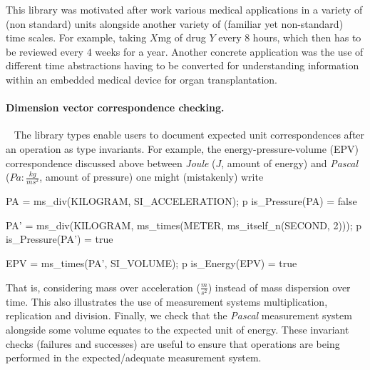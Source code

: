 \documentclass[runningheads,a4paper]{llncs}
\begin{document}
This library was motivated after work various medical applications in a variety of (non standard) units alongside another variety of (familiar yet non-standard) time scales. For example, taking \(X\)mg of drug \(Y\) every \(8\) hours, which then has to be reviewed every \(4\) weeks for a year. Another concrete application was the use of different time abstractions having to be converted for understanding information within an embedded medical device for organ transplantation.  

\paragraph*{Dimension vector correspondence checking.}~
%
The library types enable users to document expected unit correspondences after an operation as type invariants. For example, the energy-pressure-volume (EPV) correspondence discussed above between \textit{Joule} (\(J\), amount of energy) and \textit{Pascal} (\(Pa: \frac{kg}{ms^2}\), amount of pressure) one might (mistakenly) write
%
\begin{vdmsl}[frame=none,basicstyle=\ttfamily\scriptsize]
    PA = ms_div(KILOGRAM, SI_ACCELERATION);
    p is_Pressure(PA) 
    = false

    PA' = ms_div(KILOGRAM, ms_times(METER, ms_itself_n(SECOND, 2)));
    p is_Pressure(PA')
    = true

    EPV = ms_times(PA', SI_VOLUME);
    p is_Energy(EPV)
    = true
\end{vdmsl}
%
\noindent That is, considering mass over acceleration (\(\frac{m}{s^2}\)) instead of mass dispersion over time. This also illustrates the use of measurement systems multiplication, replication and division. Finally, we check that the \textit{Pascal} measurement system alongside some volume equates to the expected unit of energy. These invariant checks (failures and successes) are useful to ensure that operations are being performed in the expected/adequate measurement system.  

\end{document}
